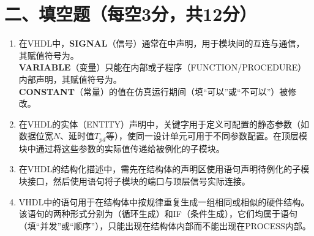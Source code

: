 \newpage

\section*{二、填空题（每空3分，共12分）}

\begin{enumerate}[label=\arabic*.]

\item 在VHDL中，\textbf{SIGNAL}（信号）通常在\underline{\hspace{2.5cm}}中声明，用于模块间的互连与通信，其赋值符号为\underline{\hspace{1cm}}。\\
\textbf{VARIABLE}（变量）只能在\underline{\hspace{2.5cm}}内部或子程序（FUNCTION/PROCEDURE）内部声明，其赋值符号为\underline{\hspace{1cm}}。\\
\textbf{CONSTANT}（常量）的值在仿真运行期间\underline{\hspace{2cm}}（填“可以”或“不可以”）被修改。

\vspace{0.8cm}

\item 在VHDL的实体（ENTITY）声明中，\underline{\hspace{2.5cm}}关键字用于定义可配置的静态参数（如数据位宽$N$、延时值$T_{pd}$等），使同一设计单元可用于不同参数配置。在顶层模块中通过\underline{\hspace{2.5cm}}将这些参数的实际值传递给被例化的子模块。

\vspace{0.8cm}

\item 在VHDL的结构化描述中，需先在结构体的声明区使用\underline{\hspace{2.5cm}}语句声明待例化的子模块接口，然后使用\underline{\hspace{2.5cm}}语句将子模块的端口与顶层信号实际连接。

\vspace{0.8cm}

\item VHDL中的\underline{\hspace{2.5cm}}语句用于在结构体中按规律重复生成一组相同或相似的硬件结构。该语句的两种形式分别为\underline{\hspace{2cm}}（循环生成）和IF（条件生成），它们均属于\underline{\hspace{2cm}}语句（填“并发”或“顺序”），只能出现在结构体内部而不能出现在PROCESS内部。

\end{enumerate}

